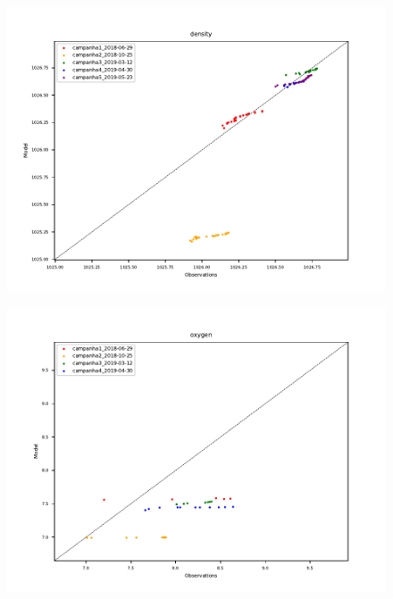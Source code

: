 \documentclass{article}
\begin{document}
\begin{figure}
	\includegraphics[width=\textwidth]{../comparison/density.pdf}
\end{figure}

\begin{figure}
	\includegraphics[width=\textwidth]{../comparison/oxygen.pdf}
\end{figure}
\end{document}
